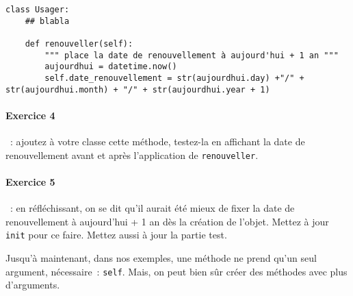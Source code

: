 \documentclass{article}
\begin{document}
\begin{verbatim}
class Usager:
    ## blabla
    
    def renouveller(self):
        """ place la date de renouvellement à aujourd'hui + 1 an """
        aujourdhui = datetime.now()
        self.date_renouvellement = str(aujourdhui.day) +"/" + str(aujourdhui.month) + "/" + str(aujourdhui.year + 1)
\end{verbatim}

\paragraph{Exercice 4}~: ajoutez à votre classe cette méthode, testez-la en affichant la date de renouvellement avant et après  l'application de \texttt{renouveller}.

\paragraph{Exercice 5}~: en réfléchissant, on se dit qu'il aurait été mieux de fixer la date de renouvellement à aujourd'hui + 1 an dès la création de l'objet. Mettez à jour \texttt{init} pour ce faire. Mettez aussi à jour la partie test.

Jusqu'à maintenant, dans nos exemples, une méthode ne prend qu'un seul argument, nécessaire~: \texttt{self}. Mais, on peut bien sûr créer des méthodes avec plus d'arguments.

  
\end{document}
